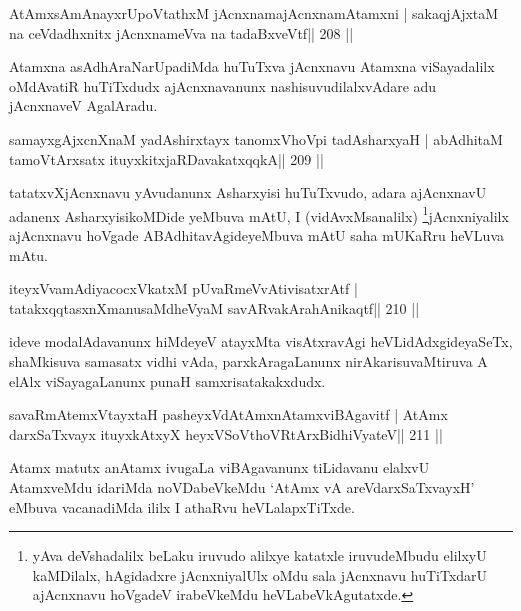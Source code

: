 \begin{shl}
AtAmxsAmAnayxrUpoVtathxM jAcnxnamajAcnxnamAtamxni |
sakaqjAjxtaM na ceVdadhxnitx jAcnxnameVva na tadaBxveVtf\hfill || 208 ||
\end{shl}

\begin{artha}
Atamxna asAdhAraNarUpadiMda huTuTxva jAcnxnavu Atamxna viSayadalilx oMdAvatiR huTiTxdudx ajAcnxnavanunx nashisuvudilalxvAdare adu jAcnxnaveV AgalAradu.
\end{artha}

\begin{shl}
samayxgAjxcnXnaM yadAshirxtayx tanomxVhoV\s pi tadAsharxyaH |
abAdhitaM tamoV\s tArx\s\s satx ituyxkitxjaRDavakatxqqkA\hfill || 209 ||
\end{shl}

\begin{artha}
tatatxvXjAcnxnavu yAvudanunx Asharxyisi huTuTxvudo, adara ajAcnxnavU adanenx AsharxyisikoMDide yeMbuva mAtU, I (vidAvxMsanalilx) \footnote[2]{yAva deVshadalilx beLaku iruvudo alilxye katatxle iruvudeMbudu elilxyU kaMDilalx, hAgidadxre jAcnxniyalUlx oMdu sala jAcnxnavu huTiTxdarU ajAcnxnavu hoVgadeV irabeVkeMdu heVLabeVkAgutatxde.}jAcnxniyalilx ajAcnxnavu hoVgade ABAdhitavAgideyeMbuva mAtU saha mUKaRru heVLuva mAtu.
\end{artha}

\begin{shl}
iteyxVvamAdi\footnotemark[3] yacocxVkatxM pUvaRmeVvAtivisatxrAtf |
tatakxqqtasxnXmanusaMdheVyaM savARva\footnotemark[4]kArahAnikaqtf\hfill || 210 ||
\end{shl}

\begin{artha}
ideve modalAdavanunx hiMdeyeV atayxMta visAtxravAgi heVLidAdxgideyaSeTx, shaMkisuva samasatx vidhi vAda, parxkAragaLanunx nirAkarisuvaMtiruva A elAlx viSayagaLanunx punaH samxrisatakakxdudx.
\end{artha}

\begin{shl}
savaRmAtemxVtayxtaH pasheyxVdAtAmxnAtamxviBAgavitf |
AtAmx darxSaTxvayx ituyxkAtxyX heyxVSoV\s thoVR\s tArxBidhiVyateV\hfill || 211 ||
\end{shl}

\begin{artha}
Atamx matutx anAtamx ivugaLa viBAgavanunx tiLidavanu elalxvU AtamxveMdu idariMda noVDabeVkeMdu `AtAmx vA areVdarxSaTxvayxH' eMbuva vacanadiMda ililx I athaRvu heVLalapxTiTxde.
\end{artha}

